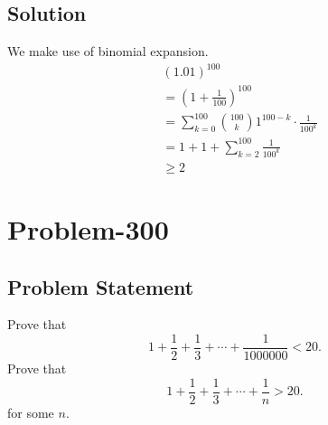 \documentclass[12pt]{article}
\begin{document}
\subsection*{Solution}
We make use of binomial expansion.
\begin{equation*}
	\begin{aligned}
		& (1.01)^{100}\\
		&= \left( 1 + \frac{1}{100} \right)^{100}\\
		&= \sum_{k = 0}^{100} \binom{100}{k} 1^{100-k}\cdot \frac{1}{100^{k}}\\
		&= 1 + 1 + \sum_{k=2}^{100}\frac{1}{100^k}\\
		&\geq 2
	\end{aligned}
\end{equation*}

\section*{Problem-300}
\subsection*{Problem Statement}
Prove that
\[
	1 + \frac{1}{2} + \frac{1}{3} + \cdots + \frac{1}{1000000} < 20.
\]
Prove that
\[
	1 + \frac{1}{2} + \frac{1}{3} + \cdots + \frac{1}{n} > 20.
\]
for some $n$.
\end{document}
